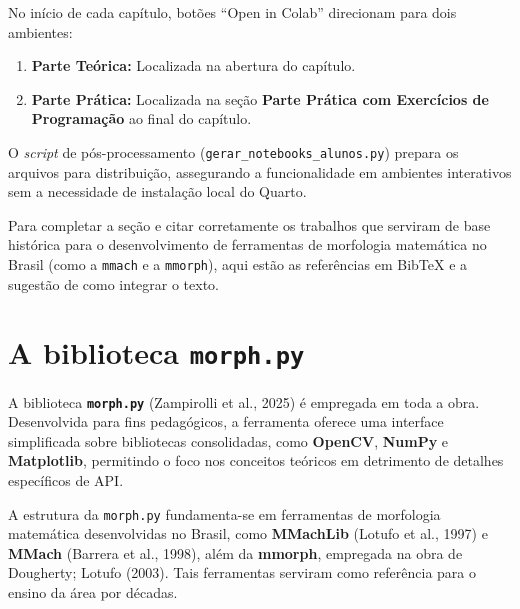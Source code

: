 \documentclass[
  portuguese,
  letterpaper,
  openany,
  oneside,
  12pt,
  a4paper]{book}
\providecommand{\tightlist}{%
  \setlength{\itemsep}{0pt}\setlength{\parskip}{0pt}}
\begin{document}
No início de cada capítulo, botões ``Open in Colab'' direcionam para
dois ambientes:

\begin{enumerate}
\def\labelenumi{\arabic{enumi}.}
\tightlist
\item
  \textbf{Parte Teórica:} Localizada na abertura do capítulo.
\item
  \textbf{Parte Prática:} Localizada na seção \textbf{
  Parte Prática com Exercícios de Programação} ao final do capítulo.
\end{enumerate}

O \emph{script} de pós-processamento
(\texttt{gerar\_notebooks\_alunos.py}) prepara os arquivos para
distribuição, assegurando a funcionalidade em ambientes interativos sem
a necessidade de instalação local do Quarto.

Para completar a seção e citar corretamente os trabalhos que serviram de
base histórica para o desenvolvimento de ferramentas de morfologia
matemática no Brasil (como a \texttt{mmach} e a \texttt{mmorph}), aqui
estão as referências em BibTeX e a sugestão de como integrar o texto.

\section*{\texorpdfstring{A biblioteca
\texttt{morph.py}}{A biblioteca morph.py}}\label{a-biblioteca-morph.py}


A biblioteca \textbf{\texttt{morph.py}} (Zampirolli et al., 2025) é
empregada em toda a obra. Desenvolvida para fins pedagógicos, a
ferramenta oferece uma interface simplificada sobre bibliotecas
consolidadas, como \textbf{OpenCV}, \textbf{NumPy} e
\textbf{Matplotlib}, permitindo o foco nos conceitos teóricos em
detrimento de detalhes específicos de API.

\begin{tcolorbox}[enhanced jigsaw, coltitle=black, colback=white, colbacktitle=quarto-callout-note-color!10!white, bottomtitle=1mm, left=2mm, opacityback=0, breakable, rightrule=.15mm, titlerule=0mm, toptitle=1mm, opacitybacktitle=0.6, title=\textcolor{quarto-callout-note-color}{\faInfo}\hspace{0.5em}{Herança Técnica}, colframe=quarto-callout-note-color-frame, arc=.35mm, bottomrule=.15mm, toprule=.15mm, leftrule=.75mm]

A estrutura da \texttt{morph.py} fundamenta-se em ferramentas de
morfologia matemática desenvolvidas no Brasil, como \textbf{MMachLib}
(Lotufo et al., 1997) e \textbf{MMach} (Barrera et al., 1998), além da
\textbf{mmorph}, empregada na obra de Dougherty; Lotufo (2003). Tais
ferramentas serviram como referência para o ensino da área por décadas.

\end{tcolorbox}
\end{document}
